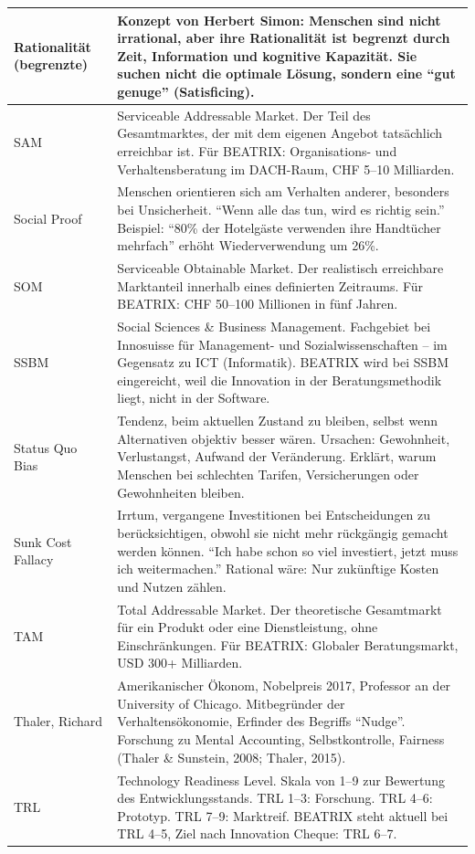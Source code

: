 \documentclass[11pt,a4paper]{article}
\begin{document}
\begin{longtable}{@{}L{4cm}L{10cm}@{}}
\midrule
Rationalität (begrenzte) & Konzept von Herbert Simon: Menschen sind nicht irrational, aber ihre Rationalität ist begrenzt durch Zeit, Information und kognitive Kapazität. Sie suchen nicht die optimale Lösung, sondern eine ``gut genuge'' (Satisficing). \\
\midrule
SAM & Serviceable Addressable Market. Der Teil des Gesamtmarktes, der mit dem eigenen Angebot tatsächlich erreichbar ist. Für BEATRIX: Organisations- und Verhaltensberatung im DACH-Raum, CHF 5--10 Milliarden. \\
\midrule
Social Proof & Menschen orientieren sich am Verhalten anderer, besonders bei Unsicherheit. ``Wenn alle das tun, wird es richtig sein.'' Beispiel: ``80\% der Hotelgäste verwenden ihre Handtücher mehrfach'' erhöht Wiederverwendung um 26\%. \\
\midrule
SOM & Serviceable Obtainable Market. Der realistisch erreichbare Marktanteil innerhalb eines definierten Zeitraums. Für BEATRIX: CHF 50--100 Millionen in fünf Jahren. \\
\midrule
SSBM & Social Sciences \& Business Management. Fachgebiet bei Innosuisse für Management- und Sozialwissenschaften -- im Gegensatz zu ICT (Informatik). BEATRIX wird bei SSBM eingereicht, weil die Innovation in der Beratungsmethodik liegt, nicht in der Software. \\
\midrule
Status Quo Bias & Tendenz, beim aktuellen Zustand zu bleiben, selbst wenn Alternativen objektiv besser wären. Ursachen: Gewohnheit, Verlustangst, Aufwand der Veränderung. Erklärt, warum Menschen bei schlechten Tarifen, Versicherungen oder Gewohnheiten bleiben. \\
\midrule
Sunk Cost Fallacy & Irrtum, vergangene Investitionen bei Entscheidungen zu berücksichtigen, obwohl sie nicht mehr rückgängig gemacht werden können. ``Ich habe schon so viel investiert, jetzt muss ich weitermachen.'' Rational wäre: Nur zukünftige Kosten und Nutzen zählen. \\
\midrule
TAM & Total Addressable Market. Der theoretische Gesamtmarkt für ein Produkt oder eine Dienstleistung, ohne Einschränkungen. Für BEATRIX: Globaler Beratungsmarkt, USD 300+ Milliarden. \\
\midrule
Thaler, Richard & Amerikanischer Ökonom, Nobelpreis 2017, Professor an der University of Chicago. Mitbegründer der Verhaltensökonomie, Erfinder des Begriffs ``Nudge''. Forschung zu Mental Accounting, Selbstkontrolle, Fairness (Thaler \& Sunstein, 2008; Thaler, 2015). \\
\midrule
TRL & Technology Readiness Level. Skala von 1--9 zur Bewertung des Entwicklungsstands. TRL 1--3: Forschung. TRL 4--6: Prototyp. TRL 7--9: Marktreif. BEATRIX steht aktuell bei TRL 4--5, Ziel nach Innovation Cheque: TRL 6--7. \\

\end{longtable}
\end{document}
